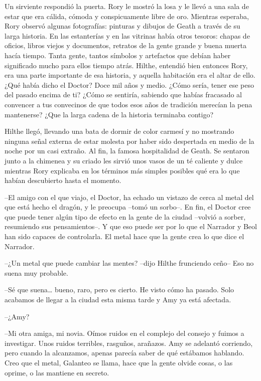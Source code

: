 {Un sirviente respondió la puerta. Rory le mostró la losa y le llevó a
	una sala de estar que era cálida, cómoda y conspicuamente libre de oro.
	Mientras esperaba, Rory observó algunas fotografías: pinturas y dibujos
	de Geath a través de su larga historia. En las estanterías y en las
	vitrinas había otros tesoros: chapas de oficios, libros viejos y
	documentos, retratos de la gente grande y buena muerta hacía tiempo.
	Tanta gente, tantos símbolos y artefactos que debían haber significado
	mucho para ellos tiempo atrás. Hilthe, entendió bien entonces Rory, era
	una parte importante de esa historia, y aquella habitación era el altar
	de ello. ¿Qué había dicho el Doctor? Doce mil años y medio. ¿Cómo sería,
	tener ese peso del pasado encima de ti? ¿Cómo se sentiría, sabiendo que
	habías fracasado al convencer a tus convecinos de que todos esos años de
	tradición merecían la pena mantenerse? ¿Que la larga cadena de la
historia terminaba contigo?}

{Hilthe llegó, llevando una bata de dormir de color carmesí y no
	mostrando ninguna señal externa de estar molesta por haber sido
	despertada en medio de la noche por un casi extraño. Al fin, la famosa
	hospitalidad de Geath. Se sentaron junto a la chimenea y su criado les
	sirvió unos vasos de un té caliente y dulce mientras Rory explicaba en
	los términos más simples posibles qué era lo que habían descubierto
hasta el momento.}

{--El amigo con el que viajo, el Doctor, ha echado un vistazo de cerca
	al metal del que está hecho el dragón, y le preocupa --tomó un sorbo--.
	En fin, el Doctor cree que puede tener algún tipo de efecto en la gente
	de la ciudad --volvió a sorber, resumiendo sus pensamientos--. Y que eso
	puede ser por lo que el Narrador y Beol han sido capaces de controlarla.
El metal hace que la gente crea lo que dice el Narrador.}

{--¿Un metal que puede cambiar las mentes? --dijo Hilthe frunciendo
ceño-- Eso no suena muy probable.}

{--Sé que suena\ldots{} bueno, raro, pero es cierto. He visto cómo ha
	pasado. Solo acabamos de llegar a la ciudad esta misma tarde y Amy ya
está afectada.}

{--¿Amy?}

{--Mi otra amiga, mi novia. Oímos ruidos en el complejo del consejo y
	fuimos a investigar. Unos ruidos terribles, rasguños, arañazos. Amy se
	adelantó corriendo, pero cuando la alcanzamos, apenas parecía saber de
	qué estábamos hablando. Creo que el metal, Galanteo se llama, hace que
la gente olvide cosas, o las oprime, o las mantiene en secreto.}

